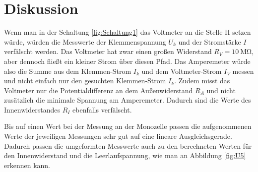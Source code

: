 \newpage
\section{Diskussion}
\label{sec:Diskussion}

Wenn man in der Schaltung \ref{fig:Schaltung1} das Voltmeter an die Stelle H
setzen würde, würden die Messwerte der Klemmenspannung $U_k$ und der
Stromstärke $I$ verfälscht werden. Das Voltmeter hat zwar einen großen
Widerstand $R_V = \SI{10}{\mega\ohm}$, aber dennoch fließt ein kleiner Strom
über diesen Pfad. Das Amperemeter würde also die Summe aus dem
Klemmen-Strom $I_k$ und dem Voltmeter-Strom $I_V$ messen und nicht einfach
nur den gesuchten Klemmen-Strom $I_k$.
Zudem misst das Voltmeter nur die Potentialdifferenz an dem Außenwiderstand
$R_A$ und nicht zusätzlich die minimale Spannung am Amperemeter. Dadurch
sind die Werte des Innenwiderstandes $R_I$ ebenfalls verfälscht.

Bis auf einen Wert bei der Messung an der Monozelle passen die aufgenommenen
Werte der jeweiligen Messungen sehr gut auf eine lineare Ausgleichsgerade.
Dadurch passen die umgeformten Messwerte auch zu den berechneten
Werten für den Innenwiderstand und die Leerlaufspannung, wie man an
Abbildung \ref{fig:U5} erkennen kann.

\newpage
